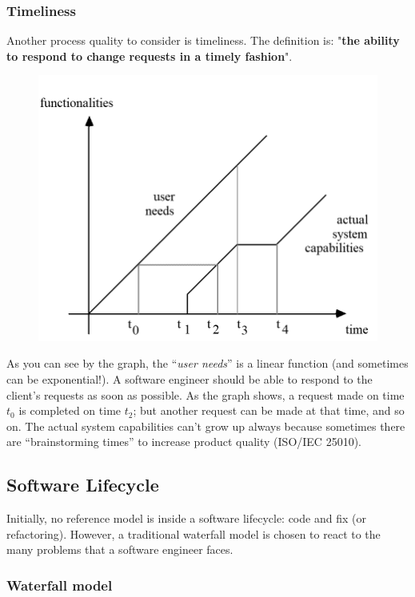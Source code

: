 \documentclass[a4paper]{article}
\newcommand{\dquotes}[1]{``#1''}
\begin{document}
    \newpage

    \subsubsection{Timeliness}

    Another process quality to consider is timeliness. The definition is: "\textbf{the ability to respond to change requests in a timely fashion}".
    \begin{figure}[!htp]
        \centering
        \includegraphics[width=.8\textwidth]{img/timeliness-1.png}
    \end{figure}

    \noindent
    As you can see by the graph, the \dquotes{\emph{user needs}} is a linear function (and sometimes can be exponential!). A software engineer should be able to respond to the client's requests as soon as possible. As the graph shows, a request made on time $t_{0}$ is completed on time $t_{2}$; but another request can be made at that time, and so on. The actual system capabilities can't grow up always because sometimes there are \dquotes{brainstorming times} to increase product quality (ISO/IEC 25010).

    \newpage

    \subsection{Software Lifecycle}

    Initially, no reference model is inside a software lifecycle: code and fix (or refactoring). However, a traditional waterfall model is chosen to react to the many problems that a software engineer faces.
    
    \subsubsection{Waterfall model}
    
\end{document}
